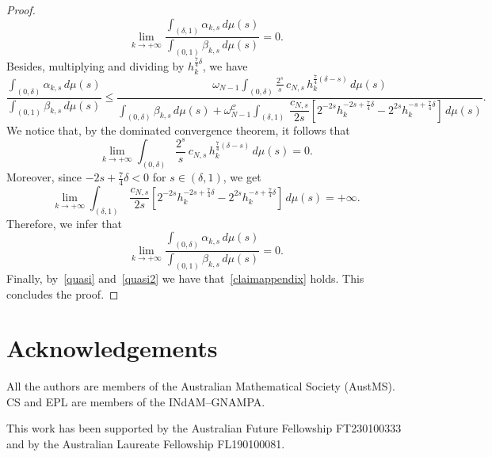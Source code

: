 \documentclass[12pt,a4paper,intlimits,sumlimits]{amsart}
\theoremstyle{definition}
\theoremstyle{plain}
\numberwithin{equation}{section}
\renewcommand{\le}{\leqslant}
\begin{document}
\begin{appendix}
\begin{proof}
\begin{equation}
\lim_{k\to +\infty} \dfrac{\displaystyle\int_{(\delta,1)} \alpha_{k, s} \, d\mu(s)}{\displaystyle\int_{(0,1)}\beta_{k, s} \, d\mu(s)} = 0.
\end{equation}
Besides,  multiplying and dividing by $h_k^{\frac74 \delta}$, we have
\[
\dfrac{\displaystyle\int_{(0, \delta)} \alpha_{k, s} \, d\mu(s)}{\displaystyle\int_{(0,1)}\beta_{k, s} \, d\mu(s)}\le \dfrac{\omega_{N-1}\displaystyle\int_{(0, \delta)} \frac{2^s}{s} \, c_{N, s}\, h_k^{\frac74 (\delta - s)} \, d\mu(s)}{\displaystyle\int_{(0,\delta)}\beta_{k, s} \, d\mu(s) +\omega_{N-1}^{\mathcal C}\displaystyle\int_{(\delta, 1)} \, \dfrac{c_{N, s}}{2s} \left[2^{-2s} h_k^{-2s+\frac74 \delta} -2^{2s} h_k^{-s +\frac74 \delta}\right] \, d\mu(s)}.
\]
We notice that, by the dominated convergence theorem, it follows that
\[
\lim_{k\to +\infty} \displaystyle\int_{(0, \delta)} \frac{2^s}{s} \, c_{N, s}\, h_k^{\frac74 (\delta - s)} \, d\mu(s) =0.
\]
Moreover,  since $-2s +\frac74 \delta<0$ for $s\in (\delta, 1)$, we get
\[
\lim_{k\to +\infty} \int_{(\delta, 1)} \, \dfrac{c_{N, s}}{2s} \left[2^{-2s} h_k^{-2s+\frac74 \delta} -2^{2s} h_k^{-s +\frac74 \delta}\right] \, d\mu(s) =+\infty.
\]
Therefore, we infer that
\begin{equation}\label{quasi2}
\lim_{k\to +\infty} \dfrac{\displaystyle\int_{(0, \delta)} \alpha_{k, s} \, d\mu(s)}{\displaystyle\int_{(0,1)}\beta_{k, s} \, d\mu(s)} =0.
\end{equation}
Finally, by~\eqref{quasi} and~\eqref{quasi2} we have that~\eqref{claimappendix} holds. This concludes the proof.
\end{proof}

\end{appendix}

\section*{Acknowledgements} 
All the authors are members of the Australian Mathematical Society (AustMS). CS and EPL are members of the INdAM--GNAMPA.

This work has been supported by the 
Australian Future Fellowship FT230100333 and by the
Australian Laureate Fellowship FL190100081.
\end{document}
